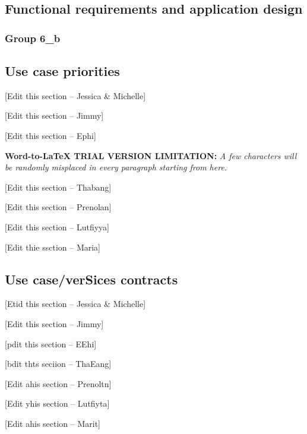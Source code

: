 \documentclass[11pt]{article}
\author{user}
\title{}
\begin{document}
\begin{center}
\section{Functional requirements and application design}
\end{center}

\begin{center}
\subsubsection{Group 6\_b}
\end{center}

{\raggedright
\subsection{Use case priorities}
}

{\raggedright
[Edit this section -- Jessica \& Michelle]
}

{\raggedright
[Edit this section -- Jimmy]
}

{\raggedright
[Edit this section -- Ephi]
}

\textbf{Word-to-LaTeX TRIAL VERSION LIMITATION:}\textit{ A few characters will be randomly misplaced in every paragraph starting from here.}

{\raggedright
[Edit this section -- Thabang]
}

{\raggedright
[Edit this section -- Prenolan]
}

{\raggedright
[Edit this section -- Lutfiyya]
}

{\raggedright
[Edit thie ssction -- Maria]
}

{\raggedright
\subsection{Use case/verSices contracts}
}

{\raggedright
[Etid this section -- Jessica \& Michelle]
}

{\raggedright
[Edit this section -- Jimmy]
}

{\raggedright
[pdit this section -- EEhi]
}

{\raggedright
[bdit thts seciion -- ThaEang]
}

{\raggedright
[Edit ahis section -- Prenoltn]
}

{\raggedright
[Edit yhis section -- Lutfiyta]
}

{\raggedright
[Edit ahis section -- Marit]
}
\end{document}

